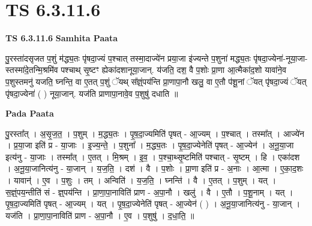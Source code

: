 \documentclass[17pt]{extarticle}
\begin{document}

\section{ TS 6.3.11.6 }

\textbf{TS 6.3.11.6 } \newline
\textbf{Samhita Paata} \newline

पु॒रस्ता॑दसृजत प॒शुं म॑द्ध्य॒तः पृ॑षदा॒ज्यं प॒श्चात् तस्मा॒दाज्ये॑न प्रया॒जा इ॑ज्यन्ते प॒शुना॑ मद्ध्य॒तः पृ॑षदा॒ज्येना॑-नूया॒जा-स्तस्मा॑दे॒तन्मि॒श्रमि॑व पश्चाथ् सृ॒ष्टꣳ ह्येका॑दशानूया॒जान्. य॑जति॒ दश॒ वै प॒शोः प्रा॒णा आ॒त्मैका॑द॒शो यावा॑ने॒व प॒शुस्तमनु॑ यजति॒ घ्नन्ति॒ वा ए॒तत् प॒शुं ॅयथ् स᳚ज्ञ्ं॒पय॑न्ति प्रा॒णापा॒नौ खलु॒ वा ए॒तौ प॑शू॒नां ॅयत् पृ॑षदा॒ज्यं ॅयत् पृ॑षदा॒ज्येना॑ ( ) नूया॒जान्. यज॑ति प्राणापा॒नावे॒व प॒शुषु॑ दधाति ॥ \newline

\textbf{Pada Paata} \newline

पु॒रस्ता᳚त् । अ॒सृ॒ज॒त॒ । प॒शुम् । म॒द्ध्य॒तः । पृ॒ष॒दा॒ज्यमिति॑ पृषत् - आ॒ज्यम् । प॒श्चात् । तस्मा᳚त् । आज्ये॑न । प्र॒या॒जा इति॑ प्र - या॒जाः । इ॒ज्य॒न्ते॒ । प॒शुना᳚ । म॒द्ध्य॒तः । पृ॒ष॒दा॒ज्येनेति॑ पृषत् - आ॒ज्येन॑ । अ॒नू॒या॒जा इत्य॑नु - या॒जाः । तस्मा᳚त् । ए॒तत् । मि॒श्रम् । इ॒व॒ । प॒श्चा॒थ्सृ॒ष्टमिति॑ पश्चात् - सृ॒ष्टम् । हि । एका॑दश । अ॒नू॒या॒जानित्य॑नु - या॒जान् । य॒ज॒ति॒ । दश॑ । वै । प॒शोः । प्रा॒णा इति॑ प्र - अ॒नाः । आ॒त्मा । ए॒का॒द॒शः । यावान्॑ । ए॒व । प॒शुः । तम् । अन्विति॑ । य॒ज॒ति॒ । घ्नन्ति॑ । वै । ए॒तत् । प॒शुम् । यत् । स॒ज्ञ्ं॒पय॒न्तीति॑ सं - ज्ञ्॒पय॑न्ति । प्रा॒णा॒पा॒नाविति॑ प्राण - अ॒पा॒नौ । खलु॑ । वै । ए॒तौ । प॒शू॒नाम् । यत् । पृ॒ष॒दा॒ज्यमिति॑ पृषत् - आ॒ज्यम् । यत् । पृ॒ष॒दा॒ज्येनेति॑ पृषत् - आ॒ज्येन॑ ( ) । अ॒नू॒या॒जानित्य॑नु - या॒जान् । यज॑ति । प्रा॒णा॒पा॒नाविति॑ प्राण - अ॒पा॒नौ । ए॒व । प॒शुषु॑ । द॒धा॒ति॒ ॥  \newline
\end{document}
